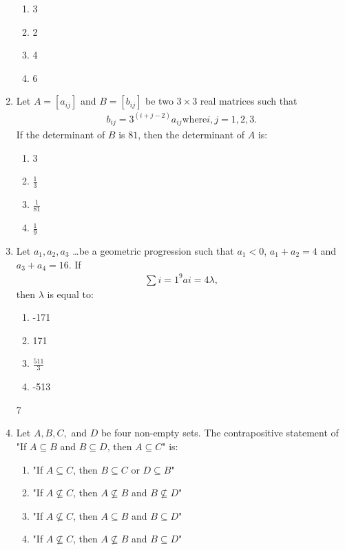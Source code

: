 \documentclass{article}
\begin{document}
\begin{enumerate}
\begin{enumerate}
   \item 3
   \item 2
   \item 4
   \item 6
\end{enumerate}

\item Let $A = [a_{ij}]$ and $B = [b_{ij}]$ be two $3 \times 3$ real matrices such that\begin{align*}b_{ij} = 3^{(i+j-2)} a_{ij} \text{where} i,j = 1,2,3.\end{align*}If the determinant of $B$ is $81$, then the determinant of $A$ is:

\begin{enumerate}
   \item 3
   \item $\frac{1}{3}$
   \item $\frac{1}{81}$
   \item $\frac{1}{9}$
\end{enumerate}

\item Let $a_1, a_2, a_3 $ \dots be a geometric progression such that $a_1 < 0$, $a_1 + a_2 = 4$ and $a_3 + a_4 = 16$. If\begin{align*}\sum {i=1}^{9} a i = 4\lambda,\end{align*}then $\lambda$ is equal to:

\begin{enumerate}
   \item -171
   \item 171
   \item $\frac{511}{3}$
   \item -513
\end{enumerate}
7
\item Let $A, B, C,$ and $D$ be four non-empty sets. The contrapositive statement of "If $A \subseteq B$ and $B \subseteq D$, then $A \subseteq C$" is:

\begin{enumerate}
   \item "If $A \subseteq C$, then $B \subseteq C$ or $D \subseteq B$"
   \item "If $A \not\subseteq C$, then $A \not\subseteq B$ and $B \not\subseteq D$"
   \item "If $A \not\subseteq C$, then $A \subseteq B$ and $B \subseteq D$"
   \item "If $A \not\subseteq C$, then $A \not\subseteq B$ and $B \subseteq D$"
\end{enumerate}


\end{enumerate}
\end{document}
